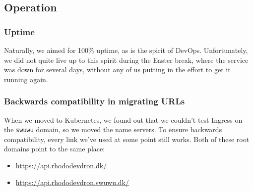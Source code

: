 \subsection{Operation}

\subsubsection{Uptime}

Naturally, we aimed for 100\% uptime, as is the spirit of DevOps. Unfortunately, we did not quite live up to this spirit during the Easter break, where the service was down for several days, without any of us putting in the effort to get it running again.


\subsubsection{Backwards compatibility in migrating URLs}

When we moved to Kubernetes, we found out that we couldn't test Ingress on the \texttt{swuwu} domain, so we moved the name servers. To ensure backwards compatibility, every link we've used at some point still works. Both of these root domains point to the same place:
\begin{itemize}
    \item \url{https://api.rhododevdron.dk/}
    \item \url{https://api.rhododevdron.swuwu.dk/}
\end{itemize}
